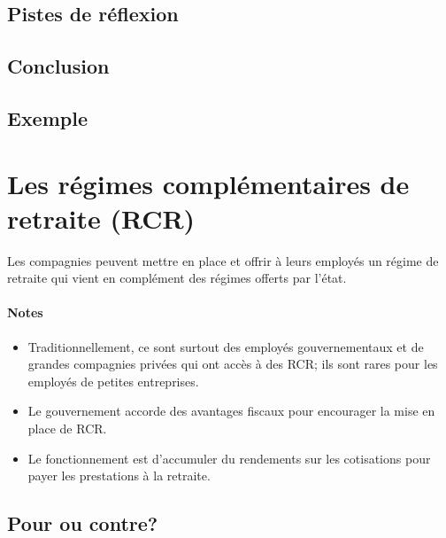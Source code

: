 \documentclass[10pt, french]{article}
\begin{document}
\begin{multicols*}{3}
\subsection*{Pistes de réflexion}

\subsection*{Conclusion}

\subsection*{Exemple}

\newpage

\section{Les régimes complémentaires de retraite (RCR)}

\begin{definitionNOHFILL}
Les compagnies peuvent mettre en place et offrir à leurs employés un régime de retraite qui vient en complément des régimes offerts par l'état. 

\paragraph{Notes}
\begin{itemize}[leftmargin = *]
	\item	Traditionnellement, ce sont surtout des employés gouvernementaux et de grandes compagnies privées qui ont accès à des RCR; ils sont rares pour les employés de petites entreprises.
	\item	Le gouvernement accorde des avantages fiscaux pour encourager la mise en place de RCR.
	\item	Le fonctionnement est d'accumuler du rendements sur les cotisations pour payer les prestations à la retraite.
\end{itemize}
\end{definitionNOHFILL}

\subsection*{Pour ou contre?}


\end{multicols*}
\end{document}
